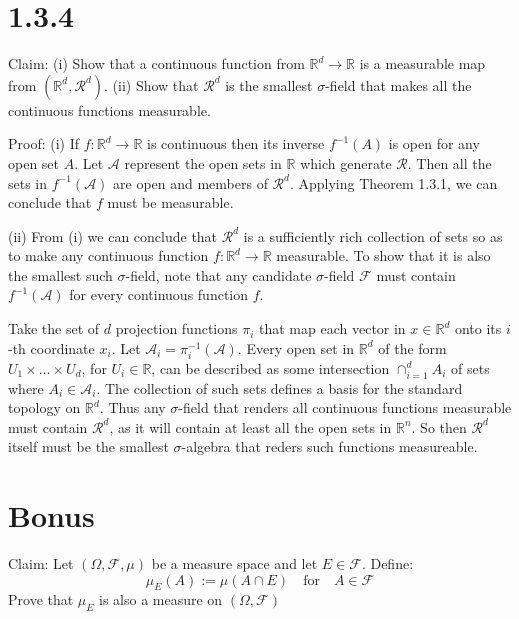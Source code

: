 \documentclass[10pt]{article}
\begin{document}
\section*{1.3.4}
  Claim: (i) Show that a continuous function from $\mathbb{R}^d \to \mathbb{R}$
  is a measurable map from $(\mathbb{R}^d, \mathcal{R}^d)$.
  (ii) Show that $\mathcal{R}^d$ is the smallest $\sigma$-field
  that makes all the continuous functions measurable.

  Proof: (i) If $f : \mathbb{R}^d \to \mathbb{R}$ 
  is continuous then its inverse $f^{-1}(A)$ 
  is open for any open set $A$.
  Let $\mathcal{A}$ represent the open sets in $\mathbb{R}$ which
  generate $\mathcal{R}$. Then all the sets in $f^{-1}(\mathcal{A})$
  are open and members of $\mathcal{R}^d$.
  Applying Theorem 1.3.1, we can conclude that $f$
  must be measurable.
  
  (ii) From (i) we can conclude that $\mathcal{R}^d$ is a sufficiently
  rich collection of sets so as to make any continuous function 
  $f: \mathbb{R}^d \to \mathbb{R}$ measurable. To show that it is also 
  the smallest such $\sigma$-field, note that any candidate $\sigma$-field
  $\mathcal{F}$ must contain $f^{-1}(\mathcal{A})$ for every continuous
  function $f$.

  Take the set of $d$ projection functions $\pi_i$ that map each 
  vector in $x \in \mathbb{R}^d$ onto its $i$-th coordinate $x_i$.
  Let $\mathcal{A}_i = \pi_i^{-1}(\mathcal{A})$. Every open
  set in $\mathbb{R}^d$ of the form $U_1 \times \dots \times U_d$,
  for $U_i \in \mathbb{R}$, can be described as some intersection 
  $\cap_{i=1}^d A_i$ of sets where $A_i \in \mathcal{A}_i$.
  The collection of such sets defines a basis for the standard topology
  on $\mathbb{R}^d$. Thus any $\sigma$-field that renders all 
  continuous functions measurable must contain $\mathcal{R}^d$,
  as it will contain at least all the open sets in $\mathbb{R}^n$.
  So then $\mathcal{R}^d$ itself must be the smallest
  $\sigma$-algebra that reders such functions measureable.

\section*{Bonus}
  Claim: Let $(\Omega, \mathcal{F}, \mu)$ be a measure space and let
  $E \in \mathcal{F}$. Define:
  \begin{equation*}
    \mu_E(A) := \mu(A \cap E) \quad \text{for} \quad A \in \mathcal{F}
  \end{equation*}
  Prove that $\mu_E$ is also a measure on $(\Omega, \mathcal{F})$
\end{document}
